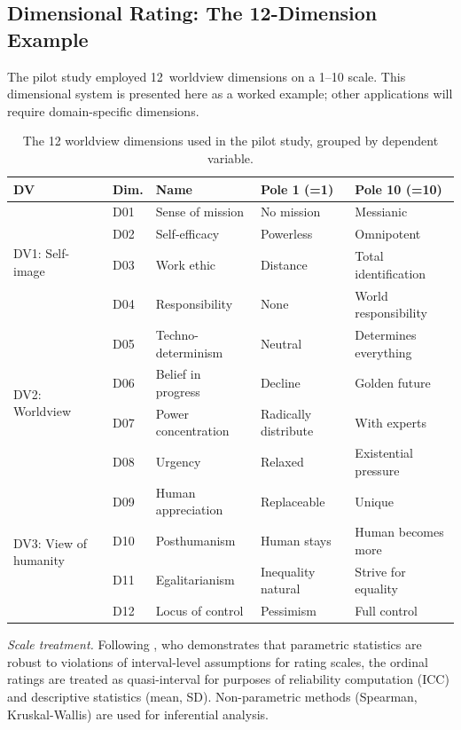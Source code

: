 \documentclass[11pt,a4paper]{article}
\begin{document}
\subsection{Dimensional Rating: The 12-Dimension Example}
\label{sec:method:dimensions}

The pilot study employed 12~worldview dimensions on a 1--10 scale. This dimensional system is presented here as a worked example; other applications will require domain-specific dimensions.

\begin{table}[htbp]
  \centering
  \caption{The 12 worldview dimensions used in the pilot study, grouped by dependent variable.}
  \label{tab:dimensions}
  \small
  \begin{tabular}{l l l l l}
    \toprule
    \textbf{DV} & \textbf{Dim.} & \textbf{Name} & \textbf{Pole 1 (=1)} & \textbf{Pole 10 (=10)} \\
    \midrule
    \multirow{4}{*}{DV1: Self-image}
    & D01 & Sense of mission & No mission & Messianic \\
    & D02 & Self-efficacy & Powerless & Omnipotent \\
    & D03 & Work ethic & Distance & Total identification \\
    & D04 & Responsibility & None & World responsibility \\
    \midrule
    \multirow{4}{*}{DV2: Worldview}
    & D05 & Techno-determinism & Neutral & Determines everything \\
    & D06 & Belief in progress & Decline & Golden future \\
    & D07 & Power concentration & Radically distribute & With experts \\
    & D08 & Urgency & Relaxed & Existential pressure \\
    \midrule
    \multirow{4}{*}{DV3: View of humanity}
    & D09 & Human appreciation & Replaceable & Unique \\
    & D10 & Posthumanism & Human stays & Human becomes more \\
    & D11 & Egalitarianism & Inequality natural & Strive for equality \\
    & D12 & Locus of control & Pessimism & Full control \\
    \bottomrule
  \end{tabular}
\end{table}

\emph{Scale treatment.} Following \citet{Norman2010}, who demonstrates that parametric statistics are robust to violations of interval-level assumptions for rating scales, the ordinal ratings are treated as quasi-interval for purposes of reliability computation (ICC) and descriptive statistics (mean, SD). Non-parametric methods (Spearman, Kruskal-Wallis) are used for inferential analysis.
\end{document}
